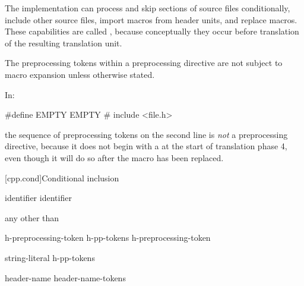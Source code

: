 \pnum
The implementation can
process and skip sections of source files conditionally,
include other source files,
import macros from header units,
and replace macros.
These capabilities are called
,
because conceptually they occur
before translation of the resulting translation unit.

\pnum
The preprocessing tokens within a preprocessing directive
are not subject to macro expansion unless otherwise stated.

\begin{example}
In:
\begin{codeblock}
#define EMPTY
EMPTY   #   include <file.h>
\end{codeblock}
the sequence of preprocessing tokens on the second line is \textit{not}
a preprocessing directive, because it does not begin with a \tcode{\#} at the start of
translation phase 4, even though it will do so after the macro 
has been replaced.
\end{example}

[cpp.cond]{Conditional inclusion}%
%

%
\begin{bnf}
\br
     identifier\br
     identifier \terminal{)}
\end{bnf}

\begin{bnf}
\br
    \textnormal{any  other than \terminal{>}}
\end{bnf}

\begin{bnf}
\br
    h-preprocessing-token\br
    h-pp-tokens h-preprocessing-token
\end{bnf}

\begin{bnf}
\br
    string-literal\br
    \terminal{<} h-pp-tokens \terminal{>}
\end{bnf}

%
\begin{bnf}
\br
     \terminal{(} header-name \terminal{)}\br
     \terminal{(} header-name-tokens \terminal{)}
\end{bnf}

